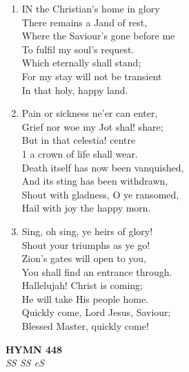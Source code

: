 \documentclass[11pt,a4paper]{article}
\begin{document}
\begin{enumerate}
    \item IN the Christian's home in glory \\
        There remains a Jand of rest, \\
        Where the Saviour's gone before me \\
        To fulfil my soul's request. \\
        Which eternally shall stand; \\
        For my stay will not be transient \\
        In that holy, happy land.

    \item Pain or sickness ne'er can enter, \\
        Grief nor woe my Jot shal! share; \\
        But in that celestia! centre \\
        1 a crown of life shall wear. \\
        Death itself has now been vanquished, \\
        And its sting has been withdrawn, \\
        Shout with gladness, O ye ransomed, \\
        Hail with joy the happy morn.

    \item Sing, oh sing, ye heirs of glory! \\
        Shout your triumphs as ye go! \\
        Zion's gates will open to you, \\
        You shall find an entrance through. \\
        Hallelujah! Christ is coming; \\
        He will take His people home. \\
        Quickly come, Lord Jesus, Saviour; \\
        Blessed Master, quickly come!

\end{enumerate}

\newpage
\begin{center}
    {\Large \textbf{HYMN 448}}
    \\
    \textit{SS SS eS}
\end{center}
\vspace{1em}
\end{document}
